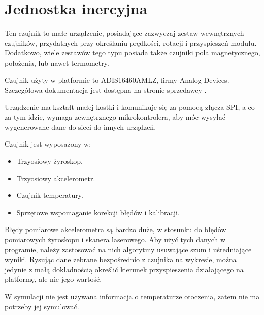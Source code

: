 \section{Jednostka inercyjna}
	Ten czujnik to małe urządzenie, posiadające zazwyczaj zestaw wewnętrznych czujników, przydatnych przy określaniu prędkości, rotacji i przyspieszeń modułu.
	Dodatkowo, wiele zestawów tego typu posiada także czujniki pola magnetycznego, położenia, lub nawet termometry.
	
	Czujnik użyty w platformie to ADIS16460AMLZ, firmy Analog Devices. Szczegółowa dokumentacja jest dostępna na stronie sprzedawcy \cite{adis_website}.
	
	Urządzenie ma kształt małej kostki i komunikuje się za pomocą złącza SPI, a co za tym idzie, wymaga zewnętrznego mikrokontrolera, aby móc wysyłać wygenerowane dane
	do sieci do innych urządzeń.
	
	Czujnik jest wyposażony w:
	\begin{itemize}
		\item Trzyosiowy żyroskop.
		\item Trzyosiowy akcelerometr.
		\item Czujnik temperatury.
		\item Sprzętowe wspomaganie korekcji błędów i kalibracji.
	\end{itemize}
	
	Błędy pomiarowe akcelerometra są bardzo duże, w stosunku do błędów pomiarowych żyroskopu i skanera laserowego. 
	Aby użyć tych danych w programie, należy zastosować na nich algorytmy usuwające szum i uśredniające wyniki.
	Rysując dane zebrane bezpośrednio z czujnika na wykresie, można jedynie z małą dokładnością określić kierunek przyspieszenia działającego na platformę, ale nie jego 
	wartość.
	
	W symulacji nie jest używana informacja o temperaturze otoczenia, zatem nie ma potrzeby jej symulować.
